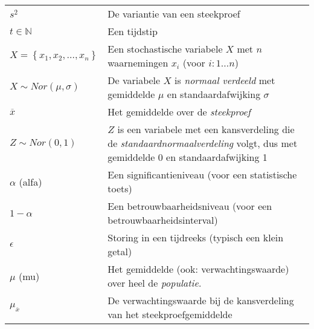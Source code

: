 \begin{table}
\begin{tabular}{p{}p{}}
  	$s^2$                                                   & De variantie van een steekproef                                                                                                        \\
  	$t \in \mathbb{N}$                                      & Een tijdstip                                                                                                                           \\
  	$X = \left\{x_1, x_2, \ldots, x_n \right\}$             & Een stochastische variabele $X$ met $n$ waarnemingen $x_i$ (voor $i: 1 \ldots n$)                                                      \\
  	$X \sim Nor(\mu, \sigma)$                               & De variabele $X$ is \emph{normaal verdeeld} met gemiddelde $\mu$ en standaardafwijking $\sigma$                                        \\
  	$\overline{x}$                                          & Het gemiddelde over de \emph{steekproef}                                                                                               \\
  	$Z \sim Nor(0, 1)$                                      & $Z$ is een variabele met een kansverdeling die de \emph{standaardnormaalverdeling} volgt, dus met gemiddelde 0 en standaardafwijking 1 \\
  	\midrule
  	$\alpha$ (alfa)                                         & Een significantieniveau (voor een statistische toets)                                                                                  \\
  	$1 - \alpha$                                            & Een betrouwbaarheidsniveau (voor een betrouwbaarheidsinterval)                                                                         \\
  	$\epsilon$                                              & Storing in een tijdreeks (typisch een klein getal)                                                                                     \\
  	$\mu$ (mu)                                              & Het gemiddelde (ook: verwachtingswaarde) over heel de \emph{populatie}.                                                                \\
  	$\mu_{\overline{x}}$                                    & De verwachtingswaarde bij de kansverdeling van het steekproefgemiddelde                                                                \\

\end{tabular}
\end{table}
